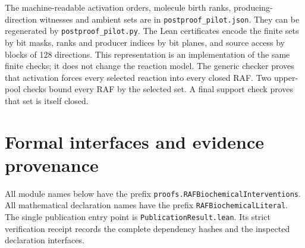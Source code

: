 \documentclass[10pt]{article}
\begin{document}
The machine-readable activation orders, molecule birth ranks, producing-direction witnesses and ambient sets are in \texttt{postproof\_pilot.json}. They can be regenerated by \texttt{postproof\_pilot.py}. The Lean certificates encode the finite sets by bit masks, ranks and producer indices by bit planes, and source access by blocks of 128 directions. This representation is an implementation of the same finite checks; it does not change the reaction model. The generic checker proves that activation forces every selected reaction into every closed RAF. Two upper-pool checks bound every RAF by the selected set. A final support check proves that set is itself closed.


\section{Formal interfaces and evidence provenance}
All module names below have the prefix \texttt{proofs.RAFBiochemicalInterventions}. All mathematical declaration names have the prefix \texttt{RAFBiochemicalLiteral}. The single publication entry point is \texttt{PublicationResult.lean}. Its strict verification receipt records the complete dependency hashes and the inspected declaration interfaces.
\end{document}
